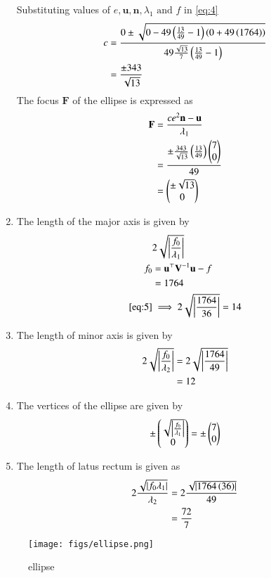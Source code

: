 \documentclass[journal,12pt,twocolumn]{IEEEtran}
\renewcommand{\vec}[1]{\boldsymbol{\mathbf{#1}}}
\begin{document}
\begin{enumerate}
Substituting values of $e,\vec{u},\vec{n},\lambda_1 \text{ and } f$ in \eqref{eq:4}
\begin{align}
	c &= \frac{0 \pm \sqrt{0-49\left(\frac{13}{49}-1\right)\left(0+49\left(1764\right)\right)}}{49\frac{\sqrt{13}}{7}\left(\frac{13}{49}-1\right)}\\
	&= \frac{\pm 343}{\sqrt{13}}
\end{align}
The focus $\vec{F}$ of the ellipse is expressed as
\begin{align}
	\vec{F} &= \frac{ce^2 \vec{n}-\vec{u}}{\lambda_1}\\
	&= \frac{\pm \frac{343}{\sqrt{13}}\brak{\frac{13}{49}}\myvec{7\\0}}{49}\\
	&= \myvec{\pm \sqrt{13}\\0}
\end{align}
\item The length of the major axis is given by
\begin{align}
	\label{eq:5}
	&2\sqrt{\abs{\frac{f_0}{\lambda_1}}}\\
	f_0 &= \vec{u}^\top \vec{V}^{-1} \vec{u} -f\\
	    &= 1764\\
	\eqref{eq:5} &\implies 2\sqrt{\abs{\frac{1764}{36}}}
	 = 14
\end{align}
\item The length of minor axis is given by
\begin{align}
	2\sqrt{\left\vert\frac{f_0}{\lambda_2}\right\vert}&= 2\sqrt{\left\vert\frac{1764}{49}\right\vert}\\
	&= 12
\end{align}
\item The vertices of the ellipse are given by
\begin{align}
	\pm \begin{pmatrix}\sqrt{\left\vert\frac{f_0}{\lambda_1}\right\vert}\\0\end{pmatrix}= \pm \begin{pmatrix}7\\0\end{pmatrix}
\end{align}
\item The length of latus rectum is given as
\begin{align}
	2\frac{\sqrt{\left\vert f_0 \lambda_1\right\vert}}{\lambda_2} &= 2\frac{\sqrt{\left\vert1764\left(36\right)\right\vert}}{49}\\
	&= \frac{72}{7}
\end{align}
\end{enumerate}

\begin{figure}[H]
    \centering
    \texttt{[image: figs/ellipse.png]}
    \caption{ellipse}
    \label{fig:ellipse}
\end{figure}
\end{document}
